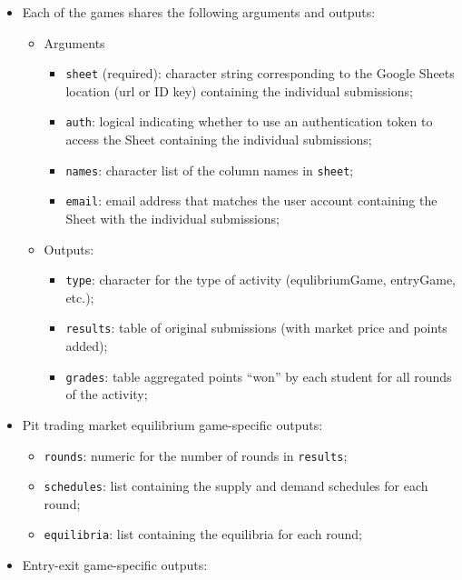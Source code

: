 \documentclass[
]{article}
\providecommand{\tightlist}{%
  \setlength{\itemsep}{0pt}\setlength{\parskip}{0pt}}
\begin{document}
\begin{itemize}
\item
  Each of the games shares the following arguments and outputs:

  \begin{itemize}
  \item
    Arguments

    \begin{itemize}
    \tightlist
    \item
      \texttt{sheet} (required): character string corresponding to the
      Google Sheets location (url or ID key) containing the individual
      submissions;
    \item
      \texttt{auth}: logical indicating whether to use an authentication
      token to access the Sheet containing the individual submissions;
    \item
      \texttt{names}: character list of the column names in
      \texttt{sheet};
    \item
      \texttt{email}: email address that matches the user account
      containing the Sheet with the individual submissions;
    \end{itemize}
  \item
    Outputs:

    \begin{itemize}
    \tightlist
    \item
      \texttt{type}: character for the type of activity (equlibriumGame,
      entryGame, etc.);
    \item
      \texttt{results}: table of original submissions (with market price
      and points added);
    \item
      \texttt{grades}: table aggregated points ``won'' by each student
      for all rounds of the activity;
    \end{itemize}
  \end{itemize}
\item
  Pit trading market equilibrium game-specific outputs:

  \begin{itemize}
  \tightlist
  \item
    \texttt{rounds}: numeric for the number of rounds in
    \texttt{results};
  \item
    \texttt{schedules}: list containing the supply and demand schedules
    for each round;
  \item
    \texttt{equilibria}: list containing the equilibria for each round;
  \end{itemize}
\item
  Entry-exit game-specific outputs:


\end{itemize}
\end{document}

